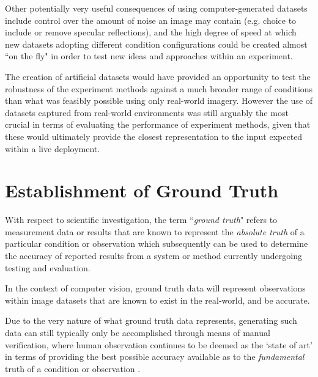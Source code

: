 Other potentially very useful consequences of using computer-generated datasets include control over the amount of noise an image may contain (e.g. choice to include or remove specular reflections), and the high degree of speed at which new datasets adopting different condition configurations could be created almost ``on the fly" in order to test new ideas and approaches within an experiment. 



The creation of artificial datasets would have provided an opportunity to test the robustness of the experiment methods against a much broader range of conditions than what was feasibly possible using only real-world imagery. However the use of datasets captured from real-world environments was still arguably the most crucial in terms of evaluating the performance of experiment methods, given that these would ultimately provide the closest representation to the input expected within a live deployment. 
%


\section{Establishment of Ground Truth}

With respect to scientific investigation, the term ``\textit{ground truth}" refers to measurement data or results that are known to represent the \textit{absolute truth} of a particular condition or observation which subsequently can be used to determine the accuracy of reported results from a system or method currently undergoing testing and evaluation.

In the context of computer vision, ground truth data will represent observations within image datasets that are known to exist in the real-world, and be accurate.

Due to the very nature of what ground truth data represents, generating such data can still typically only be accomplished through means of manual verification, where human observation continues to be deemed as the `state of art' in terms of providing the best possible accuracy available as to the \textit{fundamental} truth of a condition or observation \cite{kondermann}. 

